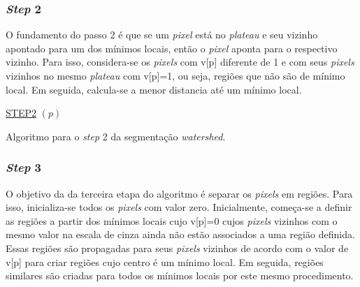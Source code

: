 \subsubsection{\textit{Step} 2} 
O fundamento do passo 2 é que se um \textit{pixel} está no \textit{plateau} e seu vizinho apontado para um dos mínimos locais, então o \textit{pixel} aponta para o respectivo vizinho. Para isso, considera-se os \textit{pixels} com v[p] diferente de 1 e com seus \textit{pixels} vizinhos no mesmo \textit{plateau} com v[p]=1, ou seja, regiões que não são de mínimo local. Em seguida, calcula-se a menor distancia até um mínimo local.

\begin{algorithm}[H]
\SetAlgoLined


    \underline{STEP2} $(p)$\;
		
 
\caption{Algoritmo para o \textit{step} 2 da segmentação \textit{watershed}. \cite{ruparelia2012implementation}}
\end{algorithm}


\subsubsection{\textit{Step} 3}
O objetivo da da terceira etapa do algoritmo é separar os \textit{pixels} em regiões. Para isso, inicializa-se todos os \textit{pixels} com valor zero. Inicialmente, começa-se a definir as regiões a partir dos mínimos locais cujo v[p]=0 cujos \textit{pixels} vizinhos com o mesmo valor na escala de cinza ainda não estão associados a uma região definida. Essas regiões são propagadas para seus \textit{pixels} vizinhos de acordo com o valor de v[p] para criar regiões cujo centro é um mínimo local. Em seguida, regiões similares são criadas para todos os mínimos locais por este mesmo procedimento.

